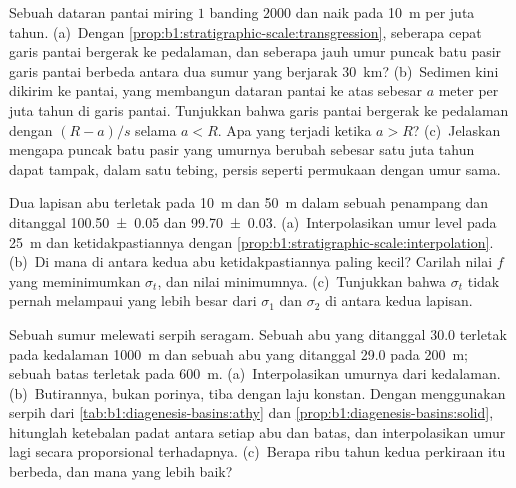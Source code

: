 \begin{exercise}[$\star\star\star$]\label{exo:b1:stratigraphic-scale:10}
Sebuah dataran pantai miring $1$ banding $2000$ dan  naik pada \qty{10}{m} per juta tahun. (a)~Dengan \cref{prop:b1:stratigraphic-scale:transgression}, seberapa cepat garis pantai bergerak ke pedalaman, dan seberapa jauh umur puncak batu pasir garis pantai berbeda antara dua sumur yang berjarak \qty{30}{km}? (b)~Sedimen kini dikirim ke pantai, yang membangun dataran pantai ke atas sebesar $a$ meter per juta tahun di garis pantai. Tunjukkan bahwa garis pantai bergerak ke pedalaman dengan $(R - a)/s$ selama $a < R$. Apa yang terjadi ketika $a > R$? (c)~Jelaskan mengapa puncak batu pasir yang umurnya berubah sebesar satu juta tahun dapat tampak, dalam satu tebing, persis seperti permukaan dengan umur sama.
\end{exercise}

\begin{exercise}[$\star\star\star$]\label{exo:b1:stratigraphic-scale:11}
Dua lapisan abu terletak pada \qty{10}{m} dan \qty{50}{m} dalam sebuah penampang dan ditanggal \qty[uncertainty-mode=separate]{100.50(5)}{\Ma} dan \qty[uncertainty-mode=separate]{99.70(3)}{\Ma}. (a)~Interpolasikan umur level pada \qty{25}{m} dan ketidakpastiannya dengan
\cref{prop:b1:stratigraphic-scale:interpolation}. (b)~Di mana di antara kedua abu ketidakpastiannya paling kecil? Carilah nilai $f$ yang meminimumkan $\sigma_t$, dan nilai minimumnya. (c)~Tunjukkan bahwa $\sigma_t$ tidak pernah melampaui yang lebih besar dari $\sigma_1$ dan $\sigma_2$ di antara kedua lapisan.
\end{exercise}

\begin{exercise}[$\star\star\star$]\label{exo:b1:stratigraphic-scale:12}
Sebuah sumur melewati serpih seragam. Sebuah abu yang ditanggal \qty{30.0}{\Ma} terletak pada kedalaman \qty{1000}{m} dan sebuah abu yang ditanggal \qty{29.0}{\Ma} pada \qty{200}{m}; sebuah batas  terletak pada \qty{600}{m}. (a)~Interpolasikan umurnya dari kedalaman. (b)~Butirannya, bukan porinya, tiba dengan laju konstan. Dengan menggunakan serpih dari \cref{tab:b1:diagenesis-basins:athy} dan
\cref{prop:b1:diagenesis-basins:solid}, hitunglah ketebalan padat antara setiap abu dan batas, dan interpolasikan umur lagi secara proporsional terhadapnya. (c)~Berapa ribu tahun kedua perkiraan itu berbeda, dan mana yang lebih baik?
\end{exercise}

